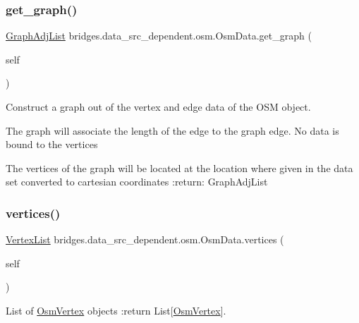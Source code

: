 \subsubsection{\texorpdfstring{get\_graph()}{get\_graph()}}
{\footnotesize\ttfamily  \mbox{\hyperlink{classbridges_1_1graph__adj__list_1_1_graph_adj_list}{Graph\+Adj\+List}} bridges.\+data\+\_\+src\+\_\+dependent.\+osm.\+Osm\+Data.\+get\+\_\+graph (\begin{DoxyParamCaption}\item[{}]{self }\end{DoxyParamCaption})}



Construct a graph out of the vertex and edge data of the O\+SM object. 

The graph will associate the length of the edge to the graph edge. No data is bound to the vertices

The vertices of the graph will be located at the location where given in the data set converted to cartesian coordinates \+:return\+: Graph\+Adj\+List \mbox{\label{classbridges_1_1data__src__dependent_1_1osm_1_1_osm_data_a305ed03b001f5b753bb6cf291d4d1026}} 
\subsubsection{\texorpdfstring{vertices()}{vertices()}\hspace{0.1cm}{\footnotesize\ttfamily [1/3]}}
{\footnotesize\ttfamily  \mbox{\hyperlink{classbridges_1_1data__src__dependent_1_1osm_1_1_osm_data_aa2bc633ab0d64a560165a1d55cc1f3a4}{Vertex\+List}} bridges.\+data\+\_\+src\+\_\+dependent.\+osm.\+Osm\+Data.\+vertices (\begin{DoxyParamCaption}\item[{}]{self }\end{DoxyParamCaption})}



List of \mbox{\hyperlink{classbridges_1_1data__src__dependent_1_1osm_1_1_osm_vertex}{Osm\+Vertex}} objects \+:return List\mbox{[}\mbox{\hyperlink{classbridges_1_1data__src__dependent_1_1osm_1_1_osm_vertex}{Osm\+Vertex}}\mbox{]}. 

\mbox{\label{classbridges_1_1data__src__dependent_1_1osm_1_1_osm_data_a5282e6f6271377843c35618d4f90be29}} 
